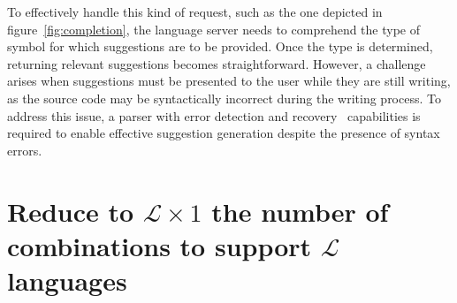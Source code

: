 To effectively handle this kind of request, such as the one depicted in figure~\ref{fig:completion}, the language server needs to comprehend the type of symbol for which suggestions are to be provided. Once the type is determined, returning relevant suggestions becomes straightforward. However, a challenge arises when suggestions must be presented to the user while they are still writing, as the source code may be syntactically incorrect during the writing process. To address this issue, a parser with error detection and recovery~\cite{Graham79} capabilities is required to enable effective suggestion generation despite the presence of syntax errors.




\section{Reduce to $\mathcal{L} \times 1$ the number of combinations to support $\mathcal{L}$ languages}


